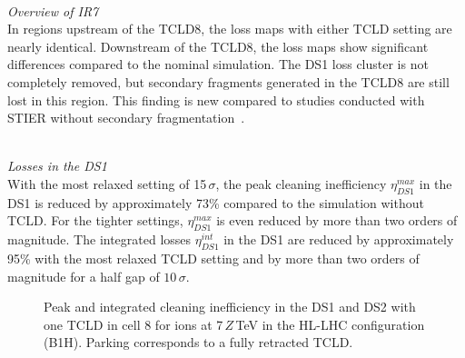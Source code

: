 \mbox{} \\
\textit{Overview of IR7}\\
In regions upstream of the TCLD8, the loss maps with either TCLD setting are nearly identical. Downstream of the TCLD8, the loss maps show significant differences compared to the nominal simulation. The DS1 loss cluster is not completely removed, but secondary fragments generated in the TCLD8 are still lost in this region. This finding is new compared to  studies conducted with STIER without secondary fragmentation~\cite{phermes_ipac2015_1}. 

\mbox{} \\
\textit{Losses in the DS1}\\ 
With the most relaxed setting of 15$\,\sigma$, the peak cleaning inefficiency $\eta_{DS1}^{max}$ in the DS1 is reduced by approximately 73\% compared to the simulation without TCLD. For the tighter settings, $\eta_{DS1}^{max}$ is even reduced by more than two orders of magnitude. The integrated losses $\eta_{DS1}^{int}$ in the DS1 are reduced by approximately 95\% with the most relaxed TCLD setting and by more than two orders of magnitude for a half gap of $10\,\sigma$.
%
%
\begin{figure}[t]
  \centering
  \caption{Peak and integrated cleaning inefficiency in the DS1 and DS2 with one TCLD in cell 8 for \lead ions at 7$\,Z\,$TeV in the HL-LHC configuration (B1H). Parking corresponds to a fully retracted TCLD.}  
  \label{pic:16081102}
  \end{figure}
%
%
%
